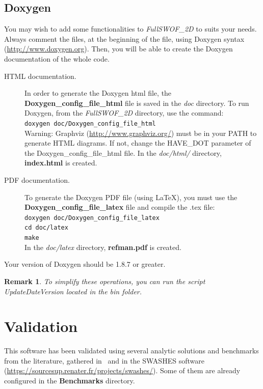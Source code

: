 \documentclass[a4paper, 11pt]{article}
\newcommand{\FullSWOF}{\emph{FullSWOF\_2D}}
\newtheorem{rmk}{Remark}
\begin{document}
\subsection{Doxygen}
You may wish to add some functionalities to \FullSWOF{} to suits your needs.
Always comment the files, at the beginning of the file, using Doxygen syntax (\url{http://www.doxygen.org}).
Then, you will be able to create the Doxygen documentation of the whole code.
\begin{description}
	\item[HTML documentation.]
		\sloppy In order to generate the Doxygen html file, the \textbf{Doxygen\_config\_file\_html} file is saved in the \emph{doc} directory.
		To run Doxygen, from the \FullSWOF{} directory, use the command:\\
		\texttt{doxygen doc/Doxygen\_config\_file\_html}\\
		Warning: Graphviz (\url{http://www.graphviz.org/}) must be in your PATH to generate HTML diagrams.
		If not, change the HAVE\_DOT parameter of the Doxygen\_config\_file\_html file.
		In the \emph{doc/html/} directory, \textbf{index.html} is created.
	\item[PDF documentation.]
		To generate the Doxygen PDF file (using \LaTeX{}), you must use the \textbf{Doxygen\_config\_file\_latex} file and compile the .tex file:\\
		\texttt{doxygen doc/Doxygen\_config\_file\_latex}\\
		\texttt{cd doc/latex}\\
		\texttt{make}\\
		In the \emph{doc/latex} directory, \textbf{refman.pdf} is created.
\end{description}
Your version of Doxygen should be 1.8.7 or greater.

\begin{rmk}
To simplify these operations, you can run the script UpdateDateVersion located in the bin folder.
\end{rmk}

\section{Validation}\label{sec:valid}

This software has been validated using several analytic solutions and benchmarks
from the literature, gathered in~\cite{Delestre13} and in the SWASHES software (\url{https://sourcesup.renater.fr/projects/swashes/}).
Some of them are already configured in the \textbf{Benchmarks} directory. 
\end{document}

